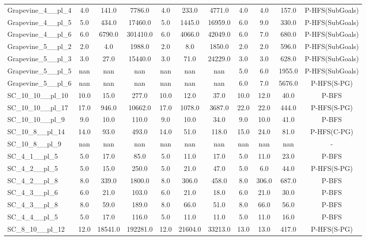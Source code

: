 \begin{table}[!ht]
\begin{tabular}{l|ccc|ccc|cccc}
Grapevine\_4\_\_pl\_4 & 4.0 & 141.0 & 7786.0 & 4.0 & 233.0 & 4771.0 & 4.0 & 4.0 & 157.0 & P-HFS(SubGoals) \\
Grapevine\_4\_\_pl\_5 & 5.0 & 434.0 & 17460.0 & 5.0 & 1445.0 & 16959.0 & 6.0 & 9.0 & 330.0 & P-HFS(SubGoals) \\
Grapevine\_4\_\_pl\_6 & 6.0 & 6790.0 & 301410.0 & 6.0 & 4066.0 & 42049.0 & 6.0 & 7.0 & 680.0 & P-HFS(SubGoals) \\
Grapevine\_5\_\_pl\_2 & 2.0 & 4.0 & 1988.0 & 2.0 & 8.0 & 1850.0 & 2.0 & 2.0 & 596.0 & P-HFS(SubGoals) \\
Grapevine\_5\_\_pl\_3 & 3.0 & 27.0 & 15440.0 & 3.0 & 71.0 & 24229.0 & 3.0 & 3.0 & 628.0 & P-HFS(SubGoals) \\
Grapevine\_5\_\_pl\_5 & nan & nan & nan & nan & nan & nan & 5.0 & 6.0 & 1955.0 & P-HFS(SubGoals) \\
Grapevine\_5\_\_pl\_6 & nan & nan & nan & nan & nan & nan & 6.0 & 7.0 & 5676.0 & P-HFS(S-PG) \\
SC\_10\_10\_\_pl\_10 & 10.0 & 15.0 & 277.0 & 10.0 & 12.0 & 37.0 & 10.0 & 12.0 & 40.0 & P-BFS \\
SC\_10\_10\_\_pl\_17 & 17.0 & 946.0 & 10662.0 & 17.0 & 1078.0 & 3687.0 & 22.0 & 22.0 & 444.0 & P-HFS(S-PG) \\
SC\_10\_10\_\_pl\_9 & 9.0 & 10.0 & 110.0 & 9.0 & 10.0 & 34.0 & 9.0 & 10.0 & 41.0 & P-BFS \\
SC\_10\_8\_\_pl\_14 & 14.0 & 93.0 & 493.0 & 14.0 & 51.0 & 118.0 & 15.0 & 24.0 & 81.0 & P-HFS(C-PG) \\
SC\_10\_8\_\_pl\_9 & nan & nan & nan & nan & nan & nan & nan & nan & nan & - \\
SC\_4\_1\_\_pl\_5 & 5.0 & 17.0 & 85.0 & 5.0 & 11.0 & 17.0 & 5.0 & 11.0 & 23.0 & P-BFS \\
SC\_4\_2\_\_pl\_5 & 5.0 & 15.0 & 250.0 & 5.0 & 21.0 & 47.0 & 5.0 & 6.0 & 44.0 & P-HFS(S-PG) \\
SC\_4\_2\_\_pl\_8 & 8.0 & 339.0 & 1800.0 & 8.0 & 306.0 & 458.0 & 8.0 & 306.0 & 687.0 & P-BFS \\
SC\_4\_3\_\_pl\_6 & 6.0 & 21.0 & 103.0 & 6.0 & 21.0 & 18.0 & 6.0 & 21.0 & 30.0 & P-BFS \\
SC\_4\_3\_\_pl\_8 & 8.0 & 59.0 & 189.0 & 8.0 & 66.0 & 51.0 & 8.0 & 66.0 & 56.0 & P-BFS \\
SC\_4\_4\_\_pl\_5 & 5.0 & 17.0 & 116.0 & 5.0 & 11.0 & 11.0 & 5.0 & 11.0 & 16.0 & P-BFS \\
SC\_8\_10\_\_pl\_12 & 12.0 & 18541.0 & 192281.0 & 12.0 & 21604.0 & 33213.0 & 13.0 & 13.0 & 417.0 & P-HFS(S-PG) \\

\end{tabular}
\end{table}
